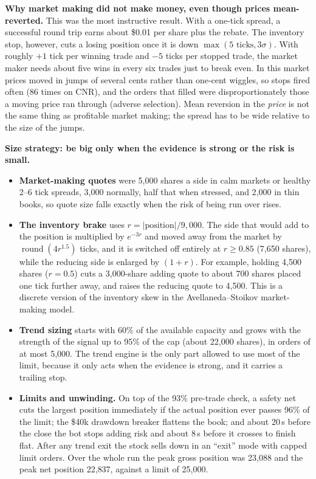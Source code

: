 \textbf{Why market making did not make money, even though prices mean-reverted.} This was the most instructive result. With a one-tick spread, a successful round trip earns about \$0.01 per share
plus the rebate. The inventory stop, however, cuts a losing position once it is down $\max(5\text{ ticks}, 3\sigma)$. With roughly $+1$ tick per winning trade and $-5$ ticks per stopped trade,
the market maker needs about five wins in every six trades just to break even. In this market prices moved in jumps of several cents rather than one-cent wiggles, so stops fired often
(86 times on CNR), and the orders that filled were disproportionately those a moving price ran through (adverse selection). Mean reversion in the \emph{price} is not the same thing as profitable
market making; the spread has to be wide relative to the size of the jumps.

\textbf{Size strategy: be big only when the evidence is strong or the risk is small.}
\begin{itemize}
  \item \textbf{Market-making quotes} were 5{,}000 shares a side in calm markets or healthy 2--6 tick spreads, 3{,}000 normally, half that when stressed, and 2{,}000 in thin books, so quote
        size falls exactly when the risk of being run over rises.
  \item \textbf{The inventory brake} uses $r = |\text{position}|/9{,}000$. The side that would add to the position is multiplied by $e^{-3r}$ and moved away from the market by
        $\operatorname{round}(4r^{1.5})$ ticks, and it is switched off entirely at $r \ge 0.85$ (7{,}650 shares), while the reducing side is enlarged by $(1+r)$. For example, holding
        4{,}500 shares ($r = 0.5$) cuts a 3{,}000-share adding quote to about 700 shares placed one tick further away, and raises the reducing quote to 4{,}500. This is a discrete version of the
        inventory skew in the Avellaneda--Stoikov market-making model.
  \item \textbf{Trend sizing} starts with 60\% of the available capacity and grows with the strength of the signal up to 95\% of the cap (about 22{,}000 shares), in orders of at most 5{,}000.
        The trend engine is the only part allowed to use most of the limit, because it only acts when the evidence is strong, and it carries a trailing stop.
  \item \textbf{Limits and unwinding.} On top of the 93\% pre-trade check, a safety net cuts the largest position immediately if the actual position ever passes 96\% of the limit; the \$40k
        drawdown breaker flattens the book; and about 20\,s before the close the bot stops adding risk and about 8\,s before it crosses to finish flat. After any trend exit the stock sells down in
        an ``exit'' mode with capped limit orders. Over the whole run the peak gross position was 23{,}088 and the peak net position 22{,}837, against a limit of 25{,}000.
\end{itemize}

